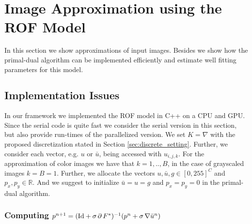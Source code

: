 \documentclass[abstracton]{scrreprt}
\begin{document}
    \section{Image Approximation using the ROF Model} %
    \label{sec:image_approximation_using_the_rof_model}
        
        In this section we show approximations of input images. Besides we show how the primal-dual algorithm can be implemented efficiently and estimate well fitting parameters for this model.

        \subsection{Implementation Issues} %
        \label{sub:implementation_issues}
            
            In our framework we implemented the ROF model in C++ on a CPU and GPU. Since the serial code is quite fast we consider the serial version in this section, but also provide run-times of the parallelized version. We set $K = \nabla$ with the proposed discretization stated in Section \ref{sec:discrete_setting}. Further, we consider each vector, e.g. $u$ or $\bar{u}$, being accessed with $u_{i,j,k}$. For the approximation of color images we have that $k = 1, .., B$, in the case of grayscaled images $k = B = 1$. Further, we allocate the vectors $u, \bar{u}, g \in [0,255]^{C}$ and $p_{x}, p_{y} \in \mathbb{R}$. And we suggest to initialize $\bar{u} = u = g$ and $p_{x} = p_{y} = 0$ in the primal-dual algorithm.

            \subsubsection{Computing $p^{n+1} = (\textnormal{Id} + \sigma\,\partial\,F^{\ast})^{-1}(p^{n} + \sigma\,\nabla\bar{u}^{n})$}
            \label{sub:computing_p}
\end{document}
